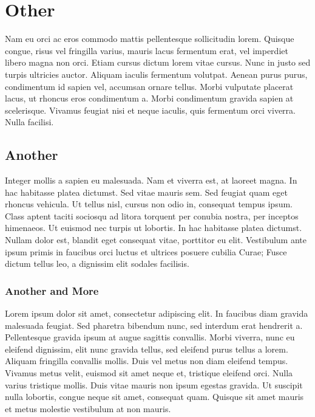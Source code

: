 
\section{Other}
\label{sec:Other}

Nam eu orci ac eros commodo mattis pellentesque sollicitudin lorem. Quisque congue, risus vel fringilla varius, mauris lacus fermentum erat, vel imperdiet libero magna non orci. Etiam cursus dictum lorem vitae cursus. Nunc in justo sed turpis ultricies auctor. Aliquam iaculis fermentum volutpat. Aenean purus purus, condimentum id sapien vel, accumsan ornare tellus. Morbi vulputate placerat lacus, ut rhoncus eros condimentum a. Morbi condimentum gravida sapien at scelerisque. Vivamus feugiat nisi et neque iaculis, quis fermentum orci viverra. Nulla facilisi. 

\subsection{Another}

Integer mollis a sapien eu malesuada. Nam et viverra est, at laoreet magna. In hac habitasse platea dictumst. Sed vitae mauris sem. Sed feugiat quam eget rhoncus vehicula. Ut tellus nisl, cursus non odio in, consequat tempus ipsum. Class aptent taciti sociosqu ad litora torquent per conubia nostra, per inceptos himenaeos. Ut euismod nec turpis ut lobortis. In hac habitasse platea dictumst. Nullam dolor est, blandit eget consequat vitae, porttitor eu elit. Vestibulum ante ipsum primis in faucibus orci luctus et ultrices posuere cubilia Curae; Fusce dictum tellus leo, a dignissim elit sodales facilisis. 

\subsubsection{Another and More}

Lorem ipsum dolor sit amet, consectetur adipiscing elit. In faucibus diam gravida malesuada feugiat. Sed pharetra bibendum nunc, sed interdum erat hendrerit a. Pellentesque gravida ipsum at augue sagittis convallis. Morbi viverra, nunc eu eleifend dignissim, elit nunc gravida tellus, sed eleifend purus tellus a lorem. Aliquam fringilla convallis mollis. Duis vel metus non diam eleifend tempus. Vivamus metus velit, euismod sit amet neque et, tristique eleifend orci. Nulla varius tristique mollis. Duis vitae mauris non ipsum egestas gravida. Ut suscipit nulla lobortis, congue neque sit amet, consequat quam. Quisque sit amet mauris et metus molestie vestibulum at non mauris. 